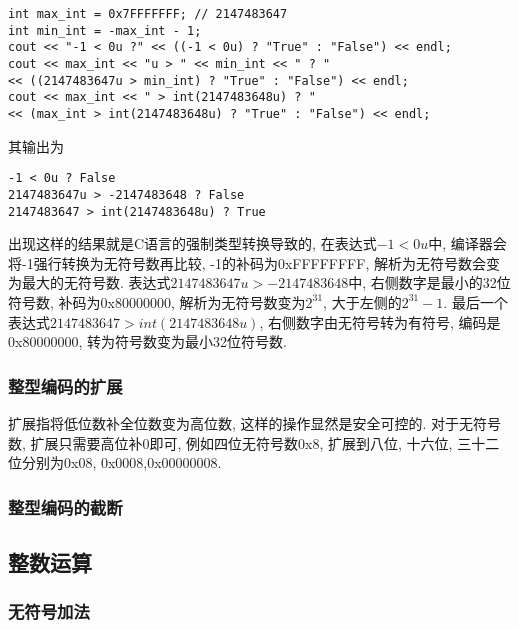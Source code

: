 \documentclass[utf8]{ctexart} %
\begin{document}
\lstset{language=c++}
\begin{lstlisting}
int max_int = 0x7FFFFFFF; // 2147483647
int min_int = -max_int - 1;
cout << "-1 < 0u ?" << ((-1 < 0u) ? "True" : "False") << endl;
cout << max_int << "u > " << min_int << " ? "
<< ((2147483647u > min_int) ? "True" : "False") << endl;
cout << max_int << " > int(2147483648u) ? "
<< (max_int > int(2147483648u) ? "True" : "False") << endl;
\end{lstlisting}
其输出为
\lstset{language=c++}
\begin{lstlisting}
-1 < 0u ? False
2147483647u > -2147483648 ? False
2147483647 > int(2147483648u) ? True
\end{lstlisting}
出现这样的结果就是C语言的强制类型转换导致的, 在表达式$-1 < 0u$中, 编译器会将-1强行转换为无符号数再比较, -1的补码为0xFFFFFFFF, 解析为无符号数会变为最大的无符号数. 表达式$2147483647u > -2147483648$中, 右侧数字是最小的32位符号数, 补码为0x80000000, 解析为无符号数变为$2^{31}$, 大于左侧的$2^{31}-1$. 最后一个表达式$2147483647 > int(2147483648u)$, 右侧数字由无符号转为有符号, 编码是0x80000000, 转为符号数变为最小32位符号数. 
\subsubsection{整型编码的扩展}
扩展指将低位数补全位数变为高位数, 这样的操作显然是安全可控的. 对于无符号数, 扩展只需要高位补0即可, 例如四位无符号数0x8, 扩展到八位, 十六位, 三十二位分别为0x08, 0x0008,0x00000008. 
\subsubsection{整型编码的截断}
\subsection{整数运算}
\subsubsection{无符号加法}
\end{document}
